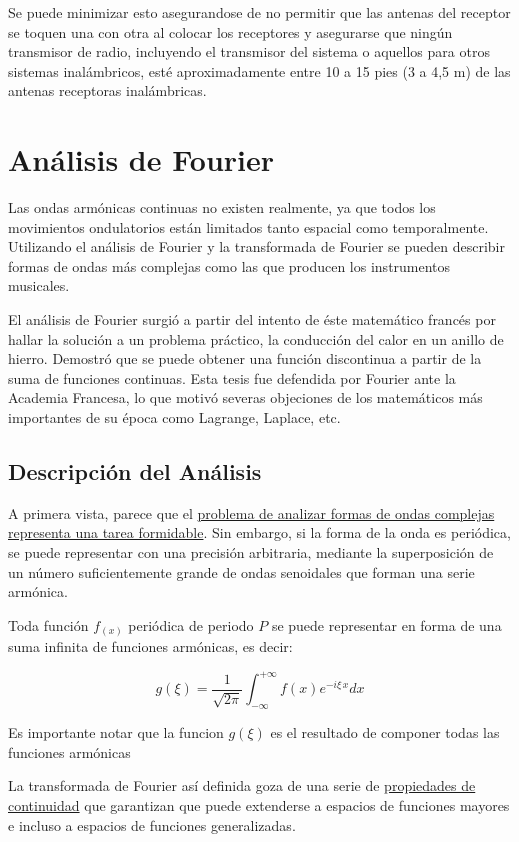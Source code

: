 \documentclass[a4paper]{article}
\begin{document}
Se puede minimizar esto asegurandose de no permitir que las antenas del
receptor se toquen una con otra al colocar los receptores y asegurarse
que ningún transmisor de radio, incluyendo el transmisor del sistema o
aquellos para otros sistemas inalámbricos, esté aproximadamente entre 10
a 15 pies (3 a 4,5 m) de las antenas receptoras inalámbricas.


\section{An\'alisis de Fourier }

Las ondas armónicas continuas no existen realmente, ya que todos los movimientos ondulatorios están limitados tanto espacial como temporalmente. Utilizando el análisis de Fourier y la transformada de Fourier se pueden describir formas de ondas más complejas como las que producen los instrumentos musicales.

El análisis de Fourier surgió a partir del intento de éste matemático francés por hallar la solución a un problema práctico, la conducción del calor en un anillo de hierro. Demostró que se puede obtener una función discontinua a partir de la suma de funciones continuas. Esta tesis fue defendida por Fourier ante la Academia Francesa, lo que motivó severas objeciones de los matemáticos más importantes de su época como Lagrange, Laplace, etc.

\subsection{Descripci\'on del An\'alisis}

A primera vista, parece que el \href{http://www.sc.ehu.es/sbweb/fisica/ondas/fourier/Fourier.html}{problema de analizar formas de ondas complejas representa una tarea formidable}. Sin embargo, si la forma de la onda es periódica, se puede representar con una precisión arbitraria, mediante la superposición de un número suficientemente grande de ondas senoidales que forman una serie armónica.

Toda función \(f_{(x)}\) periódica de periodo $P$ se puede representar en forma de una suma infinita de funciones armónicas, es decir:

\[g(\xi )={\frac  {1}{{\sqrt  {2\pi }}}}\int _{{-\infty }}^{{+\infty }}f(x)e^{{-i\xi \,x}}dx\]

Es importante notar que la funcion $g(\xi)$ es el resultado de componer todas las funciones arm\'onicas

La transformada de Fourier así definida goza de una serie de \href{https://es.wikipedia.org/wiki/Transformada_de_Fourier}{propiedades de continuidad} que garantizan que puede extenderse a espacios de funciones mayores e incluso a espacios de funciones generalizadas.
\end{document}
